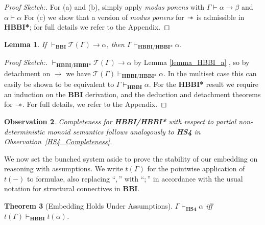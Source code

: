 \documentclass[a4paper]{article}
\newtheorem{theorem}{Theorem}[section]
\newtheorem{lemma}[theorem]{Lemma}
\newtheorem{observation}[theorem]{Observation}
\newcommand\magicwand{\mathrel{-\mkern-6mu*}}
\newcommand{\BBI}{\textbf{BBI}\xspace}
\begin{document}
\begin{proof}[Proof Sketch:] For (a) and (b), simply apply \textit{modus ponens} with $\Gamma \vdash\alpha \rightarrow \beta$ and $\alpha \vdash \alpha$
For (c) we show that a version of \textit{modus ponens} for $\magicwand$ is admissible in \textbf{HBBI*}; for full details we refer to the Appendix.    
\end{proof}

\begin{lemma}\label{HBBI_Completeness_b2}
 If $\vdash_{\BBI} \mathcal{T} (\Gamma) \rightarrow \alpha$, then $\Gamma \vdash_{\textbf{HBBI/HBBI*}}\alpha$.   
\end{lemma}

\begin{proof}[Proof Sketch:] $\vdash_{\textbf{HBBI/HBBI*}}\mathcal{T}(\Gamma)\rightarrow \alpha$ by Lemma \ref{lemma_HBBI_a} , so by detachment on $\rightarrow$ we have $\mathcal{T}(\Gamma)\vdash_{\textbf{HBBI/HBBI*}}\alpha$.
In the multiset case this can easily be shown to be equivalent to $\Gamma\vdash_{\textbf{HBBI}}\alpha$.
For the \textbf{HBBI*} result we require an induction on the \BBI derivation, and the deduction and detachment theorems for $\magicwand$. For full details, we refer to the Appendix.
\end{proof}

\begin{observation}
\sloppy Completeness for \textbf{HBBI/HBBI*} with respect to partial non-deterministic monoid semantics follows analogously to \textbf{HS4} in Observation~\ref{HS4_Completeness}.  
\end{observation}

We now set the bunched system aside to prove the stability of our embedding on reasoning with assumptions.
We write $t(\Gamma)$ for the pointwise application of $t(-)$ to formulae, also replacing ``$,$'' with ``$;$'' in accordance with the usual notation for structural connectives in \BBI.

\begin{theorem}[Embedding Holds Under Assumptions] $\Gamma \vdash_{\textbf{HS4}}\alpha$ iff $t(\Gamma)\vdash_{\textbf{HBBI}}t(\alpha)$.
\end{theorem}
\end{document}
